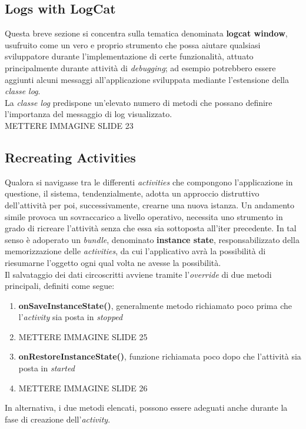 \documentclass{article}
\begin{document}
\subsection*{Logs with LogCat}
Questa breve sezione si concentra sulla tematica denominata \textbf{logcat window}, usufruito come un vero e proprio strumento che possa aiutare qualsiasi sviluppatore durante l'implementazione di certe funzionalità, attuato principalmente durante attività di \textit{debugging}; ad esempio potrebbero essere aggiunti alcuni messaggi all'applicazione sviluppata mediante l'estensione della \textit{classe log}.\vspace*{14pt}\\
La \textit{classe log} predispone un'elevato numero di metodi che possano definire l'importanza del messaggio di log visualizzato.\\
METTERE IMMAGINE SLIDE 23

\subsection*{Recreating Activities}
Qualora si navigasse tra le differenti \textit{activities} che compongono l'applicazione in questione, il sistema, tendenzialmente, adotta un approccio distruttivo dell'attività per poi, successivamente, crearne una nuova istanza. Un andamento simile provoca un sovraccarico a livello operativo, necessita uno strumento in grado di ricreare l'attività senza che essa sia sottoposta all'iter precedente. In tal senso è adoperato un \textit{bundle}, denominato \textbf{instance state}, responsabilizzato della memorizzazione delle \textit{activities}, da cui l'applicativo avrà la possibilità di riesumarne l'oggetto ogni qual volta ne avesse la possibilità.\vspace*{14pt}\\
Il salvataggio dei dati circoscritti avviene tramite l'\textit{override} di due metodi principali, definiti come segue:
\begin{enumerate}
  \itemsep0em 
  \renewcommand{\labelenumi}{ }
  \item \textbf{onSaveInstanceState()}, generalmente metodo richiamato poco prima che l'\textit{activity} sia posta in \textit{stopped}
  \item METTERE IMMAGINE SLIDE 25
  \item \textbf{onRestoreInstanceState()}, funzione richiamata poco dopo che l'attività sia posta in \textit{started}
  \item METTERE IMMAGINE SLIDE 26 
\end{enumerate}
In alternativa, i due metodi elencati, possono essere adeguati anche durante la fase di creazione dell'\textit{activity}. 
\end{document}
